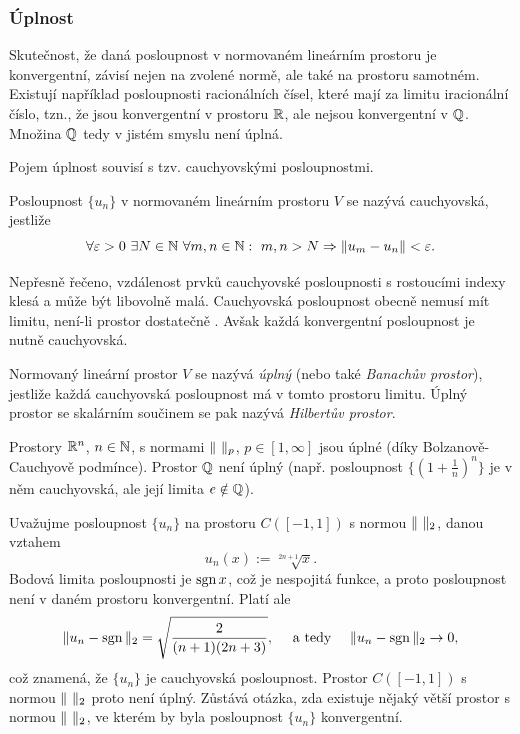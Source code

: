 \subsubsection{Úplnost}
% 
Skutečnost, že daná posloupnost v normovaném lineárním prostoru je konvergentní, závisí nejen na zvolené normě, ale také na prostoru samotném.
Existují například posloupnosti racionálních čísel, které mají za limitu iracionální číslo, tzn., že jsou konvergentní v prostoru $\mathbb R$, ale nejsou konvergentní v $\mathbb Q$.
Množina $\mathbb Q$ tedy v jistém smyslu není úplná.

Pojem úplnost souvisí s tzv. cauchyovskými posloupnostmi.
% 
\begin{df}
Posloupnost $\{u_n\}$ v normovaném lineárním prostoru $V$ se nazývá \mbox{cauchyovská}, jestliže
\[ \forall\varepsilon>0~\exists N\in\mathbb N~\forall m,n\in\mathbb N:~m,n>N\Rightarrow \|u_m-u_n\|<\varepsilon. \]
\end{df}
% 
Nepřesně řečeno, vzdálenost prvků cauchyovské posloupnosti s rostoucími indexy klesá a může být libovolně malá.
Cauchyovská posloupnost obecně nemusí mít limitu, není-li prostor dostatečně . Avšak každá konvergentní posloupnost je nutně cauchyovská.
% 
\begin{df}
Normovaný lineární prostor $V$ se nazývá \emph{úplný} (nebo také \emph{Banachův prostor}), jestliže každá cauchyovská posloupnost má v tomto prostoru limitu.
Úplný prostor se skalárním součinem se pak nazývá \emph{Hilbertův prostor}.
\end{df}
% 
\begin{ex}
Prostory $\mathbb R^n$, $n\in\mathbb N$, s normami $\|\ \|_p$, $p\in[1,\infty]$ jsou úplné (díky Bolzanově-Cauchyově podmínce).
Prostor $\mathbb Q$ není úplný (např. posloupnost $\{(1+\frac1n)^n\}$ je v něm cauchyovská, ale její limita $e\notin\mathbb Q$).
\end{ex}

\begin{ex}
Uvažujme posloupnost $\{u_n\}$ na prostoru $C([-1,1])$ s normou $\|\ \|_2$, danou vztahem
\[ u_n(x) := \sqrt[2n+1]{x}. \]
Bodová limita posloupnosti je $\operatorname{sgn} x$, což je nespojitá funkce, a proto posloupnost není v daném prostoru konvergentní.
Platí ale
\[ \|u_n-\operatorname{sgn}\|_2 = \sqrt{\frac2{(n+1)(2n+3)}}, \quad\mbox{ a tedy } \quad \|u_n-\operatorname{sgn}\|_2\rightarrow 0, \]
což znamená, že $\{u_n\}$ je cauchyovská posloupnost.
Prostor $C([-1,1])$ s normou $\|\ \|_2$ proto není úplný.
Zůstává otázka, zda existuje nějaký větší prostor s normou $\|\ \|_2$, ve kterém by byla posloupnost $\{u_n\}$ konvergentní.
\end{ex}

